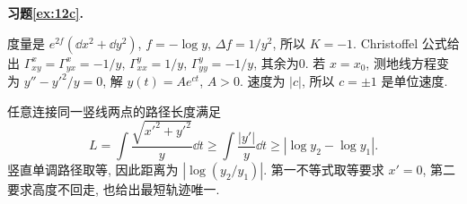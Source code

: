 \par{}
\noindent\textbf{习题\ref{ex:12c}.}
\begin{solution}
度量是 $e^{2f}(\dd x^2+\dd y^2)$, $f=-\log y$, $\Delta f=1/y^2$, 所以 $K=-1$. Christoffel 公式给出 $\Gamma^x_{xy}=\Gamma^x_{yx}=-1/y$, $\Gamma^y_{xx}=1/y$, $\Gamma^y_{yy}=-1/y$, 其余为0. 若 $x=x_0$, 测地线方程变为 $y''-y'^2/y=0$, 解 $y(t)=Ae^{ct}$, $A>0$. 速度为 $|c|$, 所以 $c=\pm1$ 是单位速度.

任意连接同一竖线两点的路径长度满足
\[
 L=\int\frac{\sqrt{x'^2+y'^2}}y\dd t
 \ge\int\frac{|y'|}y\dd t
 \ge|\log y_2-\log y_1|.
\]
竖直单调路径取等, 因此距离为 $|\log(y_2/y_1)|$. 第一不等式取等要求 $x'=0$, 第二要求高度不回走, 也给出最短轨迹唯一.
\end{solution}
